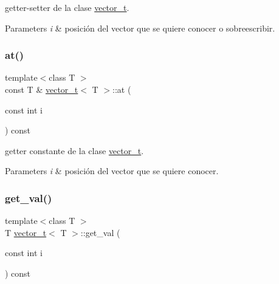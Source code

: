 getter-\/setter de la clase \hyperlink{classvector__t}{vector\+\_\+t}. 


\begin{DoxyParams}{Parameters}
{\em i} & posición del vector que se quiere conocer o sobreescribir. \\
\hline
\end{DoxyParams}
\mbox{\label{classvector__t_a01fa641865ec7b579aa08b78076150d2}} 
\subsubsection{\texorpdfstring{at()}{at()}\hspace{0.1cm}{\footnotesize\ttfamily [2/2]}}
{\footnotesize\ttfamily template$<$class T $>$ \\
const T \& \hyperlink{classvector__t}{vector\+\_\+t}$<$ T $>$\+::at (\begin{DoxyParamCaption}\item[{const int}]{i }\end{DoxyParamCaption}) const}



getter constante de la clase \hyperlink{classvector__t}{vector\+\_\+t}. 


\begin{DoxyParams}{Parameters}
{\em i} & posición del vector que se quiere conocer. \\
\hline
\end{DoxyParams}
\mbox{\label{classvector__t_a25f36650ee198fb731fbc804d179b37c}} 
\subsubsection{\texorpdfstring{get\+\_\+val()}{get\_val()}}
{\footnotesize\ttfamily template$<$class T $>$ \\
T \hyperlink{classvector__t}{vector\+\_\+t}$<$ T $>$\+::get\+\_\+val (\begin{DoxyParamCaption}\item[{const int}]{i }\end{DoxyParamCaption}) const\hspace{0.3cm}{\ttfamily [inline]}}



